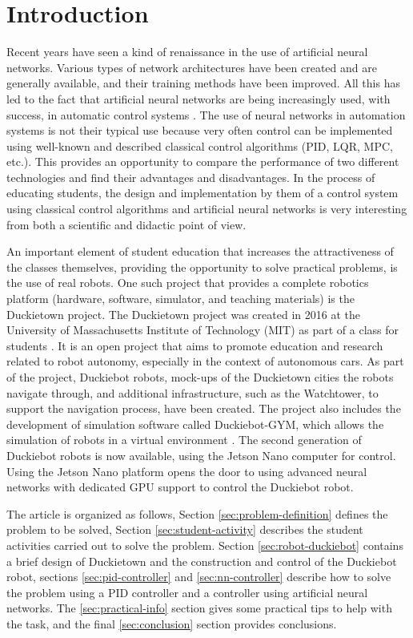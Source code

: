 \documentclass[conference]{IEEEtran}
\begin{document}
\section{Introduction}
Recent years have seen a kind of renaissance in the use of artificial neural networks. Various types of network architectures have been created and are generally available, and their training methods have been improved. All this has led to the fact that artificial neural networks are being increasingly used, with success, in automatic control systems \cite{algor2030973, 786109}. The use of neural networks in automation systems is not their typical use because very often control can be implemented using well-known and described classical control algorithms (PID, LQR, MPC, etc.). This provides an opportunity to compare the performance of two different technologies and find their advantages and disadvantages. In the process of educating students, the design and implementation by them of a control system using classical control algorithms and artificial neural networks is very interesting from both a scientific and didactic point of view.

An important element of student education that increases the attractiveness of the classes themselves, providing the opportunity to solve practical problems, is the use of real robots. One such project that provides a complete robotics platform (hardware, software, simulator, and teaching materials) is the Duckietown project.
The Duckietown project was created in 2016 at the University of Massachusetts Institute of Technology (MIT) as part of a class for students \cite{paull2017duckietown}. It is an open project that aims to promote education and research related to robot autonomy, especially in the context of autonomous cars. As part of the project, Duckiebot robots, mock-ups of the Duckietown cities the robots navigate through, and additional infrastructure, such as the Watchtower, to support the navigation process, have been created. 
The project also includes the development of simulation software called Duckiebot-GYM, which allows the simulation of robots in a virtual environment \cite{gym_duckietown}. The second generation of Duckiebot robots is now available, using the Jetson Nano computer for control. Using the Jetson Nano platform opens the door to using advanced neural networks with dedicated GPU support to control the Duckiebot robot.

The article is organized as follows, Section \ref{sec:problem-definition} defines the problem to be solved, Section \ref{sec:student-activity} describes the student activities carried out to solve the problem. Section \ref{sec:robot-duckiebot} contains a brief design of Duckietown and the construction and control of the Duckiebot robot, sections \ref{sec:pid-controller} and \ref{sec:nn-controller} describe how to solve the problem using a PID controller and a controller using artificial neural networks. The \ref{sec:practical-info} section gives some practical tips to help with the task, and the final \ref{sec:conclusion} section provides conclusions.
\end{document}
